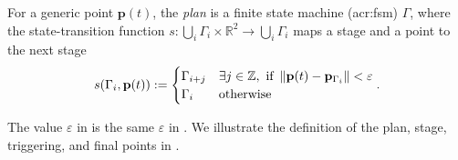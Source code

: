\begin{defn}[Plan]
  \label{def:plan}
  For a generic point $\mathbf{p}(t)$, the \emph{plan} is a finite state machine (\Gls{acr:fsm}) $\Gamma$, where the state-transition function $s:\bigcup_i{\Gamma_i}\times\mathbb{R}^2\rightarrow\bigcup_i{\Gamma_i}$ maps a stage and a point to the next stage
  \begin{equation*}s(\Gamma_i,\mathbf{p}(t)):=\begin{cases}
    \Gamma_{i+j} & \exists j\in\mathbb{Z},\text{ if }\left\lVert\mathbf{p}(t)-\mathbf{p}_{\Gamma_i}\right\rVert<\varepsilon\\
    \Gamma_i & \text{otherwise}
  \end{cases}.\end{equation*}
\end{defn}

The value $\varepsilon$ in  is the same $\varepsilon$ in . We illustrate the definition of the plan, stage, triggering, and final points in .

